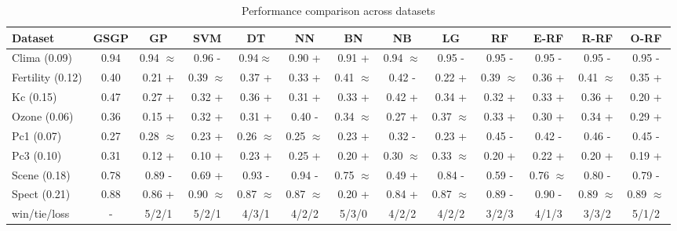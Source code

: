 \documentclass{article}
\begin{document}
\begin{table}[h]
    \centering
    \renewcommand{\arraystretch}{1.2}
    \begin{tabular}{lcccccccccccc}
        \toprule
        Dataset & GSGP & GP & SVM & DT & NN & BN & NB & LG & RF & E-RF & R-RF & O-RF \\
        \midrule
        Clima (0.09) & 0.94 & 0.94 $\approx$ & 0.96 - & 0.94$\approx$ & 0.90 + & 0.91 + & 0.94 $\approx$ & 0.95 - & 0.95 - & 0.95 - & 0.95 - & 0.95 - \\
        Fertility (0.12) & 0.40 & 0.21 + & 0.39 $\approx$ & 0.37 + & 0.33 + & 0.41 $\approx$ & 0.42 - & 0.22 + & 0.39 $\approx$ & 0.36 + & 0.41 $\approx$ & 0.35 + \\
        Kc (0.15) & 0.47 & 0.27 + & 0.32 + & 0.36 + & 0.31 + & 0.33 + & 0.42 + & 0.34 + & 0.32 + & 0.33 + & 0.36 + & 0.20 + \\
        Ozone (0.06) & 0.36 & 0.15 + & 0.32 + & 0.31 + & 0.40 - & 0.34 $\approx$ & 0.27 + & 0.37 $\approx$ & 0.33 + & 0.30 + & 0.34 + & 0.29 + \\
        Pc1 (0.07) & 0.27 & 0.28 $\approx$ & 0.23 + & 0.26 $\approx$ & 0.25 $\approx$ & 0.23 + & 0.32 - & 0.23 + & 0.45 - & 0.42 - & 0.46 - & 0.45 - \\
        Pc3 (0.10) & 0.31 & 0.12 + & 0.10 + & 0.23 + & 0.25 + & 0.20 + & 0.30 $\approx$ & 0.33 $\approx$ & 0.20 + & 0.22 + & 0.20 + & 0.19 + \\
        Scene (0.18) & 0.78 & 0.89 - & 0.69 + & 0.93 - & 0.94 - & 0.75 $\approx$ & 0.49 + & 0.84 - & 0.59 - & 0.76 $\approx$ & 0.80 - & 0.79 - \\
        Spect (0.21) & 0.88 & 0.86 + & 0.90 $\approx$ & 0.87 $\approx$ & 0.87 $\approx$ & 0.20 + & 0.84 + & 0.87 $\approx$ & 0.89 - & 0.90 - & 0.89 $\approx$ & 0.89 $\approx$ \\
        \midrule
        win/tie/loss & - & 5/2/1 & 5/2/1 & 4/3/1 & 4/2/2 & 5/3/0 & 4/2/2 & 4/2/2 & 3/2/3 & 4/1/3 & 3/3/2 & 5/1/2 \\
        \bottomrule
    \end{tabular}
    \caption{Performance comparison across datasets}
    \label{tab:results}
\end{table}



\end{document}
